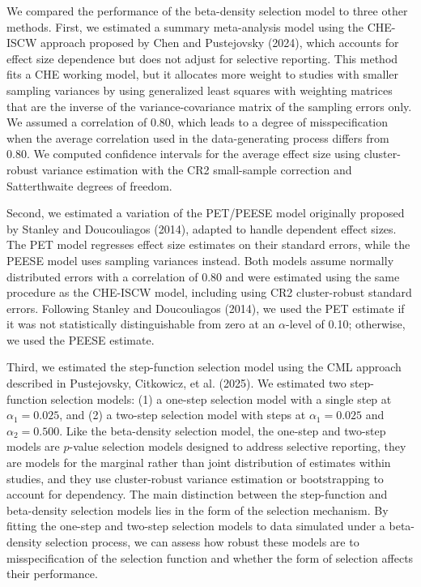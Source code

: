 \documentclass[
  man, donotrepeattitle,floatsintext]{apa7}
\begin{document}
We compared the performance of the beta-density selection model to three other methods. First, we estimated a summary meta-analysis model using the CHE-ISCW approach proposed by Chen and Pustejovsky (2024), which accounts for effect size dependence but does not adjust for selective reporting. This method fits a CHE working model, but it allocates more weight to studies with smaller sampling variances by using generalized least squares with weighting matrices that are the inverse of the variance-covariance matrix of the sampling errors only. We assumed a correlation of 0.80, which leads to a degree of misspecification when the average correlation used in the data-generating process differs from 0.80. We computed confidence intervals for the average effect size using cluster-robust variance estimation with the CR2 small-sample correction and Satterthwaite degrees of freedom.

Second, we estimated a variation of the PET/PEESE model originally proposed by Stanley and Doucouliagos (2014), adapted to handle dependent effect sizes. The PET model regresses effect size estimates on their standard errors, while the PEESE model uses sampling variances instead. Both models assume normally distributed errors with a correlation of 0.80 and were estimated using the same procedure as the CHE-ISCW model, including using CR2 cluster-robust standard errors. Following Stanley and Doucouliagos (2014), we used the PET estimate if it was not statistically distinguishable from zero at an \(\alpha\)-level of 0.10; otherwise, we used the PEESE estimate.

Third, we estimated the step-function selection model using the CML approach described in Pustejovsky, Citkowicz, et al. (2025).
We estimated two step-function selection models: (1) a one-step selection model with a single step at \(\alpha_1 = 0.025\), and (2) a two-step selection model with steps at \(\alpha_1 = 0.025\) and \(\alpha_2 = 0.500\).
Like the beta-density selection model, the one-step and two-step models are \(p\)-value selection models designed to address selective reporting, they are models for the marginal rather than joint distribution of estimates within studies, and they use cluster-robust variance estimation or bootstrapping to account for dependency.
The main distinction between the step-function and beta-density selection models lies in the form of the selection mechanism. By fitting the one-step and two-step selection models to data simulated under a beta-density selection process, we can assess how robust these models are to misspecification of the selection function and whether the form of selection affects their performance.
\end{document}
